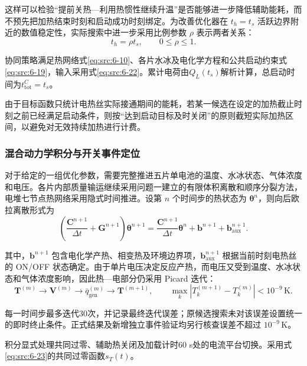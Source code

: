 \documentclass[bwprint]{gmcmthesis}
\numberwithin{equation}{section}
\numberwithin{figure}{section}
\begin{document}
 这样可以检验“提前关热—利用热惯性继续升温”是否能够进一步降低辅助能耗，而不预先把加热结束时刻和启动成功时刻绑定。为改善优化器在 \(t_h = t_s\) 活跃边界附近的数值稳定性，实际搜索中进一步采用比例参数 \(\rho\) 表示两者关系：
\begin{equation}
t_h = \rho t_s, \qquad 0 \leq \rho \leq 1. \label{eq:src:6-35}
\end{equation}

 协同策略满足热网络式\eqref{eq:src:6-10}、各片水冰及电化学方程和公共启动约束式\eqref{eq:src:6-19}，输入采用式\eqref{eq:src:6-22}。累计电荷由$Q_L(t_s)$解析计算，总启动时间为$t_{\mathrm{tot}}^C=t_s$。

 由于目标函数只统计电热丝实际接通期间的能耗，若某一候选在设定的加热截止时刻之前已经满足启动条件，则按“达到启动目标及时关闭”的原则截短实际加热区间，以避免对无效持续加热进行计费。

\subsubsection{混合动力学积分与开关事件定位}

 对于给定的一组优化参数，需要完整推进五片单电池的温度、水冰状态、气体浓度和电压。各片内部质量输运继续采用问题一建立的有限体积离散和顺序分裂方法，电堆七节点热网络采用隐式时间推进。设第 \(n\) 个时间步的热状态为 \(\boldsymbol{\theta}^n\)，则向后欧拉离散形式为
\begin{equation}
\left( \frac{\mathbf{C}^{n+1}}{\Delta t} + \mathbf{G}^{n+1} \right) \boldsymbol{\theta}^{n+1} = \frac{\mathbf{C}^{n+1}}{\Delta t} \boldsymbol{\theta}^n + \mathbf{b}^{n+1} + \mathbf{b}_{\text{aux}}^{n+1}. \label{eq:src:6-38}
\end{equation}

 其中，\(\mathbf{b}^{n+1}\) 包含电化学产热、相变热及环境边界项，\(\mathbf{b}_{\text{aux}}^{n+1}\) 根据当前时刻电热丝的 ON/OFF 状态确定。由于单片电压决定反应产热，而电压又受到温度、水冰状态和气体浓度影响，因此热—电部分仍采用 Picard 迭代：
\begin{equation}
\boldsymbol{T}^{(m)} \to \boldsymbol{V}^{(m)} \to \bar{q}_{\text{gen}}^{(m)} \to \boldsymbol{T}^{(m+1)}, \qquad \max_k \left| T_k^{(m+1)} - T_k^{(m)} \right| < 10^{-9} \, \text{K}. \label{eq:src:6-39}
\end{equation}

 每一时间步最多迭代30次，并记录最终迭代误差；原候选搜索未对该误差设置统一的即时终止条件。正式结果及新增独立事件验证均另行核查误差不超过 \(10^{-9}\,\mathrm K\)。

 积分显式处理共同过零、辅助热关闭及加载计时60 s处的电流平台切换。采用式\eqref{eq:src:6-23}的共同过零函数$s_T(t)$。
\end{document}
